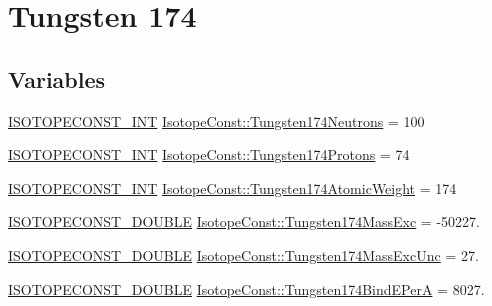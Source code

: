 \hypertarget{group___isotope_const-_tungsten-_w174}{}\section{Tungsten 174}
\label{group___isotope_const-_tungsten-_w174}
\subsection*{Variables}
\begin{DoxyCompactItemize}
\item 
\mbox{\hyperlink{group___isotope_const-_macros_ga5f18360b3e99483a35c32d789e62621c}{I\+S\+O\+T\+O\+P\+E\+C\+O\+N\+S\+T\+\_\+\+I\+NT}} \mbox{\hyperlink{group___isotope_const-_tungsten-_w174_gaa1adfd442163ab15f2ecfcddfb5243e6}{Isotope\+Const\+::\+Tungsten174\+Neutrons}} = 100
\item 
\mbox{\hyperlink{group___isotope_const-_macros_ga5f18360b3e99483a35c32d789e62621c}{I\+S\+O\+T\+O\+P\+E\+C\+O\+N\+S\+T\+\_\+\+I\+NT}} \mbox{\hyperlink{group___isotope_const-_tungsten-_w174_ga52c59014a2d7c00557a3e6e727f10316}{Isotope\+Const\+::\+Tungsten174\+Protons}} = 74
\item 
\mbox{\hyperlink{group___isotope_const-_macros_ga5f18360b3e99483a35c32d789e62621c}{I\+S\+O\+T\+O\+P\+E\+C\+O\+N\+S\+T\+\_\+\+I\+NT}} \mbox{\hyperlink{group___isotope_const-_tungsten-_w174_ga7711e9fd1b9ef472b4cac411e35f0bcd}{Isotope\+Const\+::\+Tungsten174\+Atomic\+Weight}} = 174
\item 
\mbox{\hyperlink{group___isotope_const-_macros_ga8f45a7272ce02c0b4c65c44636ed719a}{I\+S\+O\+T\+O\+P\+E\+C\+O\+N\+S\+T\+\_\+\+D\+O\+U\+B\+LE}} \mbox{\hyperlink{group___isotope_const-_tungsten-_w174_ga57db9d90168997b0091032eaf0539ff9}{Isotope\+Const\+::\+Tungsten174\+Mass\+Exc}} = -\/50227.
\item 
\mbox{\hyperlink{group___isotope_const-_macros_ga8f45a7272ce02c0b4c65c44636ed719a}{I\+S\+O\+T\+O\+P\+E\+C\+O\+N\+S\+T\+\_\+\+D\+O\+U\+B\+LE}} \mbox{\hyperlink{group___isotope_const-_tungsten-_w174_gaf8e8a7e4871aa18dadeb5d542c4928fe}{Isotope\+Const\+::\+Tungsten174\+Mass\+Exc\+Unc}} = 27.
\item 
\mbox{\hyperlink{group___isotope_const-_macros_ga8f45a7272ce02c0b4c65c44636ed719a}{I\+S\+O\+T\+O\+P\+E\+C\+O\+N\+S\+T\+\_\+\+D\+O\+U\+B\+LE}} \mbox{\hyperlink{group___isotope_const-_tungsten-_w174_gad91877e5d20d198186859f89a08652f2}{Isotope\+Const\+::\+Tungsten174\+Bind\+E\+PerA}} = 8027.
\item 

\end{DoxyCompactItemize}
